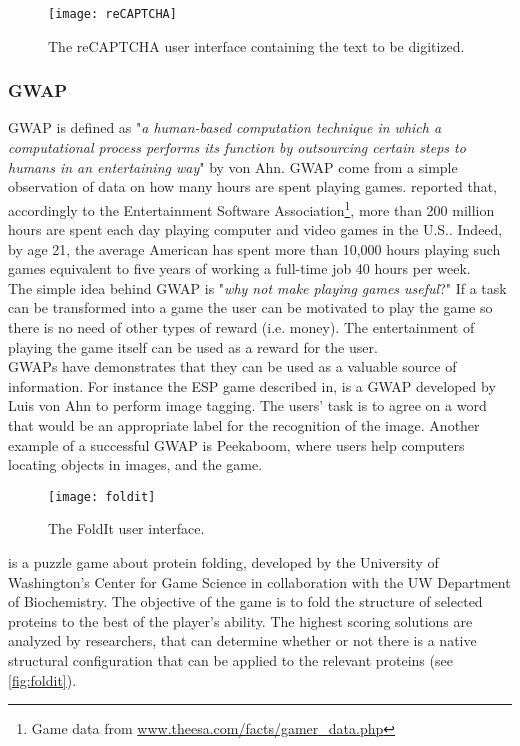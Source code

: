 \begin{figure}[htb]
    \centering
    \texttt{[image: reCAPTCHA]}
    \caption{The reCAPTCHA user interface containing the text to be digitized.}
    \label{fig:reCAPTCHA}
\end{figure}








\subsubsection{\acl{GWAP}}
\acf{GWAP} is defined as "\emph{a human-based computation technique in which a 
computational process performs its function by outsourcing certain steps to humans
in an entertaining way}" by von Ahn.
\ac{GWAP} come from a simple observation of data on how many hours are spent
playing games. \cite{von2008designing} reported that, accordingly to the
Entertainment Software Association\footnote{Game data from
\url{www.theesa.com/facts/gamer_data.php}}, more than 200 million hours are spent
each day playing computer and video games in the U.S.. Indeed, by age 21, the
average American has spent more than 10,000 hours playing such games equivalent
to five years of working a full-time job 40 hours per week.\\

The simple idea behind \ac{GWAP} is "\emph{why not make playing games useful}?"
If a task can be transformed into a game the user can be motivated to play the
game so there is no need of other types of reward (i.e. money).
The entertainment of playing the game itself can be used as a reward for
the user.\\

\ac{GWAP}s have demonstrates that they can be used as a valuable source of
information. For instance the ESP game described in\cite{von2004labeling},
is a \ac{GWAP} developed by Luis von Ahn to perform image tagging.
The users' task is to agree on a word that would be an appropriate label for the
recognition of the image. Another example of a successful \ac{GWAP} is Peekaboom, 
where users help computers locating objects in images, and the 
game.

\begin{figure}[htb]
    \centering
    \texttt{[image: foldit]}
    \caption{The FoldIt user interface.}
    \label{fig:foldit}
\end{figure}
 is a puzzle game about protein folding, developed
by the University of Washington's Center for Game Science in collaboration with
the UW Department of Biochemistry. The objective of the game is to fold the
structure of selected proteins to the best of the player's ability. The highest
scoring solutions are analyzed by researchers, that can determine whether or not
there is a native structural configuration that can be applied to the relevant
proteins (see \autoref{fig:foldit}).